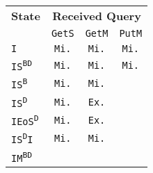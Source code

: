 \begin{tabular}{|l||c|c|c|}
 \hline

 \textbf{State}
 & \multicolumn{3}{c|}{\textbf{Received Query}}
 \\

 & \texttt{GetS} & \texttt{GetM} & \texttt{PutM}
 \\
 \hline

 \texttt{I}

 & \cellcolor{olive!80}\texttt{Mi.}
 & \cellcolor{olive!80}\texttt{Mi.}
 & \cellcolor{olive!80}\texttt{Mi.}
 \\
 \hline

 \texttt{IS\textsuperscript{BD}}

 & \cellcolor{olive!80}\texttt{Mi.}
 & \cellcolor{olive!80}\texttt{Mi.}
 & \cellcolor{olive!80}\texttt{Mi.}
 \\
 \hline

 \texttt{IS\textsuperscript{B}}

 & \cellcolor{olive!80}\texttt{Mi.}
 & \cellcolor{olive!80}\texttt{Mi.}
 & \cellcolor{black!40}
 \\
 \hline

 \texttt{IS\textsuperscript{D}}

 & \cellcolor{olive!80}\texttt{Mi.}
 & \cellcolor{orange!60}\texttt{Ex.}
 & \cellcolor{black!40}
 \\
 \hline

 \texttt{IEoS\textsuperscript{D}}

 & \cellcolor{olive!80}\texttt{Mi.}
 & \cellcolor{orange!60}\texttt{Ex.}
 & \cellcolor{black!40}
 \\
 \hline

 \texttt{IS\textsuperscript{D}I}

 & \cellcolor{olive!80}\texttt{Mi.}
 & \cellcolor{olive!80}\texttt{Mi.}
 & \cellcolor{black!40}
 \\
 \hline

 \texttt{IM\textsuperscript{BD}}


\end{tabular}
